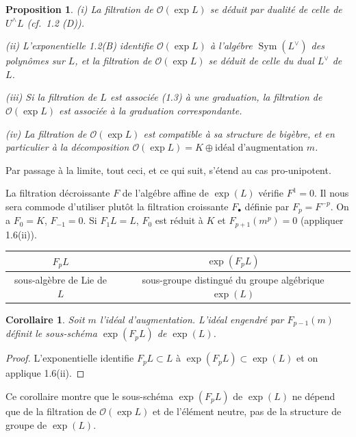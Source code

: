 \documentclass[11pt,a4paper]{article}
\theoremstyle{plain}
\newtheorem{proposition}[theorem]{Proposition}
\newtheorem{corollary}[theorem]{Corollaire}
\theoremstyle{definition}
\DeclareMathOperator{\Sym}{Sym}
\begin{document}
\begin{proposition}
\label{prop:1.6}
\emph{(i)} La filtration de $\mathcal{O}(\exp L)$ se d\'eduit par dualit\'e de celle de $U^{\wedge}L$ (cf.~1.2 (D)).

\emph{(ii)} L'exponentielle 1.2(B) identifie $\mathcal{O}(\exp L)$ \`a l'alg\'ebre $\Sym(L^{\vee})$ des polyn\^omes sur $L$, et la filtration de $\mathcal{O}(\exp L)$ se d\'eduit de celle du dual $L^{\vee}$ de $L$.

\emph{(iii)} Si la filtration de $L$ est associ\'ee (1.3) \`a une graduation, la filtration de $\mathcal{O}(\exp L)$ est associ\'ee \`a la graduation correspondante.

\emph{(iv)} La filtration de $\mathcal{O}(\exp L)$ est compatible \`a sa structure de big\`ebre, et en particulier \`a la d\'ecomposition $\mathcal{O}(\exp L) = K \oplus \text{id\'eal d'augmentation } m$.
\end{proposition}

Par passage \`a la limite, tout ceci, et ce qui suit, s'\'etend au cas pro-unipotent.

La filtration d\'ecroissante $F$ de l'alg\'ebre affine de $\exp(L)$ v\'erifie $F^1 = 0$. Il nous sera commode d'utiliser plut\^ot la filtration croissante $F_{\bullet}$ d\'efinie par $F_p = F^{-p}$. On a $F_0 = K$, $F_{-1} = 0$. Si $F_1L = L$, $F_0$ est r\'eduit \`a $K$ et $F_{p+1}(m^p) = 0$ (appliquer 1.6(ii)).

\begin{center}
\begin{tabular}{c|c}
$F_pL$ & $\exp(F_pL)$ \\ \hline
sous-alg\`ebre de Lie de $L$ & sous-groupe distingu\'e du groupe alg\'ebrique $\exp(L)$
\end{tabular}
\end{center}

\begin{corollary}
\label{cor:1.7}
Soit $m$ l'id\'eal d'augmentation. L'id\'eal engendr\'e par $F_{p-1}(m)$ d\'efinit le sous-sch\'ema $\exp(F_pL)$ de $\exp(L)$.
\end{corollary}

\begin{proof}
L'exponentielle identifie $F_pL \subset L$ \`a $\exp(F_pL) \subset \exp(L)$ et on applique 1.6(ii).
\end{proof}

Ce corollaire montre que le sous-sch\'ema $\exp(F_pL)$ de $\exp(L)$ ne d\'epend que de la filtration de $\mathcal{O}(\exp L)$ et de l'\'el\'ement neutre, pas de la structure de groupe de $\exp(L)$.
\end{document}
